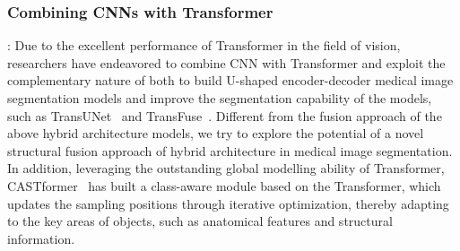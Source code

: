 \subsubsection{Combining CNNs with Transformer}:
Due to the excellent performance of Transformer in the field of vision, researchers have endeavored to combine CNN with Transformer and exploit the complementary nature of both to build U-shaped encoder-decoder medical image segmentation models and improve the segmentation capability of the models, such as TransUNet~\cite{chen2021transunet} and TransFuse~\cite{zhang2021transfuse}. Different from the fusion approach of the above hybrid architecture models, we try to explore the potential of a novel structural fusion approach of hybrid architecture in medical image segmentation. In addition, leveraging the outstanding global modelling ability of Transformer, CASTformer~\cite{you2022class} has built a class-aware module based on the Transformer, which updates the sampling positions through iterative optimization, thereby adapting to the key areas of objects, such as anatomical features and structural information.



